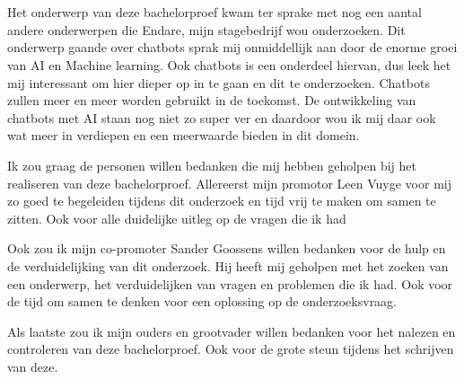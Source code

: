 
\chapter*{}
\label{ch:voorwoord}


Het onderwerp van deze bachelorproef kwam ter sprake met nog een aantal andere onderwerpen die Endare, mijn stagebedrijf wou onderzoeken. Dit onderwerp gaande over chatbots sprak mij onmiddellijk aan door de enorme groei van AI en Machine learning. Ook chatbots is een onderdeel hiervan, dus leek het mij interessant om hier dieper op in te gaan en dit te onderzoeken. Chatbots zullen meer en meer worden gebruikt in de toekomst. De ontwikkeling van chatbots met AI staan nog niet zo super ver en daardoor wou ik mij daar ook wat meer in verdiepen en een meerwaarde bieden in dit domein.

Ik zou graag de personen willen bedanken die mij hebben geholpen bij het realiseren van deze bachelorproef. Allereerst mijn promotor Leen Vuyge voor mij zo goed te begeleiden tijdens dit onderzoek en tijd vrij te maken om samen te zitten. Ook voor alle duidelijke uitleg op de vragen die ik had

Ook zou ik mijn co-promoter Sander Goossens willen bedanken voor de hulp en de verduidelijking van dit onderzoek. Hij heeft mij geholpen met het zoeken van een onderwerp, het verduidelijken van vragen en problemen die ik had. Ook voor de tijd om samen te denken voor een oplossing op de onderzoeksvraag.

Als laatste zou ik mijn ouders en grootvader willen bedanken voor het nalezen en controleren van deze bachelorproef. Ook voor de grote steun tijdens het schrijven van deze.
